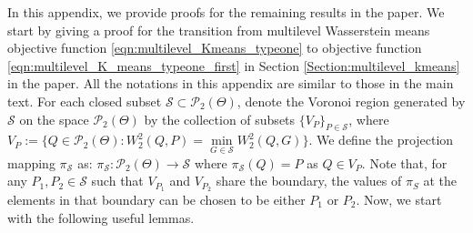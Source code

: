 In this appendix, we provide proofs for the remaining results in the paper. 
We start by giving a proof for the transition 
from multilevel Wasserstein means objective function \eqref{eqn:multilevel_Kmeans_typeone} to objective function 
\eqref{eqn:multilevel_K_means_typeone_first} in Section \ref{Section:multilevel_kmeans} in the paper. 
All the notations in this appendix are similar to those in the main text. 
For each closed subset $\mathcal{S} \subset \mathcal{P}_{2}(\Theta)$, 
denote the Voronoi region generated by $\mathcal{S}$ on the space 
$\mathcal{P}_{2}(\Theta)$ by the collection of subsets
$\{ V_P \}_{P \in \mathcal{S}}$, 
where $V_P := \{Q \in \mathcal{P}_{2}(\Theta) : W_{2}^{2}(Q,P) = 
\mathop {\min }\limits_{G \in \mathcal{S}} W_{2}^{2}(Q,G)\}$. We define the projection mapping $\pi _\mathcal{S}$ as: $\pi _{\mathcal{S}} :\mathcal{P}_{2}(\Theta)  \to \mathcal{S}$ 
where $\pi _{\mathcal{S}} (Q) = P$ as $Q \in V_{P}$. Note that, for any $P_{1}, P_{2} \in \mathcal{S}$ such that $V_{P_{1}}$ and $V_{P_{2}}$ share the boundary, the values of $\pi_{S}$ at the elements in that boundary can be chosen to be either $P_{1}$ or $P_{2}$. Now, we start with the following useful lemmas.

